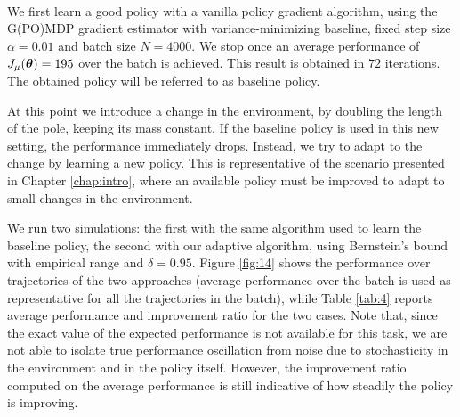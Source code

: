 \paragraph{}
We first learn a good policy with a vanilla policy gradient algorithm, using the G(PO)MDP gradient estimator with variance-minimizing baseline, fixed step size $\alpha=0.01$ and batch size $N=4000$. We stop once an average performance of $J_\mu(\boldsymbol{\theta}) = 195$ over the batch is achieved. This result is obtained in $72$ iterations. The obtained policy will be referred to as baseline policy.

At this point we introduce a change in the environment, by doubling the length of the pole, keeping its mass constant. If the baseline policy is used in this new setting, the performance immediately drops. Instead, we try to adapt to the change by learning a new policy. This is representative of the scenario presented in Chapter \ref{chap:intro}, where an available policy must be improved to adapt to small changes in the environment.

We run two simulations: the first with the same algorithm used to learn the baseline policy, the second with our adaptive algorithm, using Bernstein's bound with empirical range and $\delta=0.95$.
Figure \ref{fig:14} shows the performance over trajectories of the two approaches (average performance over the batch is used as representative for all the trajectories in the batch), while Table \ref{tab:4} reports average performance and improvement ratio for the two cases. Note that, since the exact value of the expected performance is not available for this task, we are not able to isolate true performance oscillation from noise due to stochasticity in the environment and in the policy itself. However, the improvement ratio computed on the average performance is still indicative of how steadily the policy is improving.

